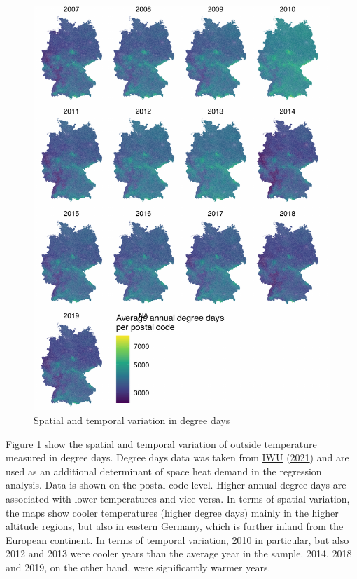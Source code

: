 \documentclass[12pt,twoside]{reedthesis}
\begin{document}
\singlespacing
\newpage
\begin{figure}

{\centering \includegraphics[width=0.77\linewidth]{figure/distribution_degree_days} 

}

\caption{Spatial and temporal variation in degree days}\label{fig:degree-days-distribution}
\end{figure}
\noindent
Figure \ref{fig:degree-days-distribution} show the spatial and temporal variation of outside temperature measured in degree days. Degree days data was taken from \protect\hyperlink{ref-iwu21}{IWU} (\protect\hyperlink{ref-iwu21}{2021}) and are used as an additional determinant of space heat demand in the regression analysis. Data is shown on the postal code level. Higher annual degree days are associated with lower temperatures and vice versa. In terms of spatial variation, the maps show cooler temperatures (higher degree days) mainly in the higher altitude regions, but also in eastern Germany, which is further inland from the European continent. In terms of temporal variation, 2010 in particular, but also 2012 and 2013 were cooler years than the average year in the sample. 2014, 2018 and 2019, on the other hand, were significantly warmer years.
\end{document}
